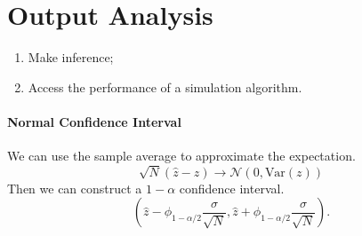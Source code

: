 \section{Output Analysis}

\begin{enumerate}
\item
Make inference;
\item
Access the performance of a simulation algorithm.
\end{enumerate}

\paragraph{Normal Confidence Interval}
We can use the sample average to approximate the expectation.
\[
\sqrt{N}(\hat{z} - z)\to \mathcal{N}(0,\text{Var}(z))
\]
Then we can construct a $1-\alpha$ confidence interval.
\[
(\hat{z} - \phi_{1-\alpha/2}\frac{\sigma}{\sqrt{N}},
\hat{z} + \phi_{1-\alpha/2}\frac{\sigma}{\sqrt{N}}
).
\]















